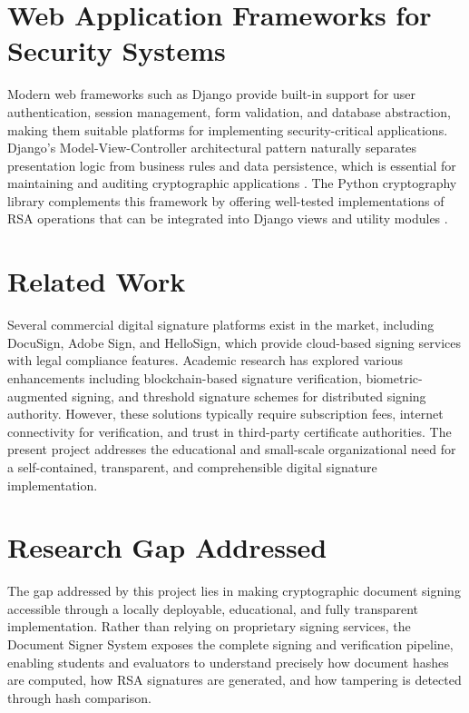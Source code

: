 \section{Web Application Frameworks for Security Systems}

Modern web frameworks such as Django provide built-in support for user authentication, session management, form validation, and database abstraction, making them suitable platforms for implementing security-critical applications. Django's Model-View-Controller architectural pattern naturally separates presentation logic from business rules and data persistence, which is essential for maintaining and auditing cryptographic applications \cite{django2024}. The Python cryptography library complements this framework by offering well-tested implementations of RSA operations that can be integrated into Django views and utility modules \cite{cryptography2024}.

\section{Related Work}

Several commercial digital signature platforms exist in the market, including DocuSign, Adobe Sign, and HelloSign, which provide cloud-based signing services with legal compliance features. Academic research has explored various enhancements including blockchain-based signature verification, biometric-augmented signing, and threshold signature schemes for distributed signing authority. However, these solutions typically require subscription fees, internet connectivity for verification, and trust in third-party certificate authorities. The present project addresses the educational and small-scale organizational need for a self-contained, transparent, and comprehensible digital signature implementation.

\section{Research Gap Addressed}

The gap addressed by this project lies in making cryptographic document signing accessible through a locally deployable, educational, and fully transparent implementation. Rather than relying on proprietary signing services, the Document Signer System exposes the complete signing and verification pipeline, enabling students and evaluators to understand precisely how document hashes are computed, how RSA signatures are generated, and how tampering is detected through hash comparison.
